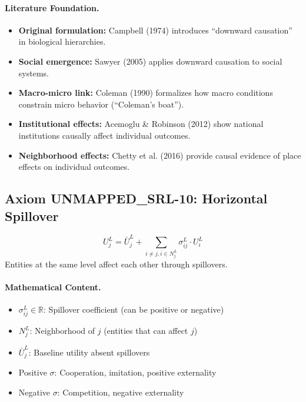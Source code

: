 \paragraph{Literature Foundation.}
\begin{itemize}
\item \textbf{Original formulation:} Campbell (1974) introduces ``downward causation'' 
in biological hierarchies.
\item \textbf{Social emergence:} Sawyer (2005) applies downward causation to 
social systems.
\item \textbf{Macro-micro link:} Coleman (1990) formalizes how macro conditions 
constrain micro behavior (``Coleman's boat'').
\item \textbf{Institutional effects:} Acemoglu \& Robinson (2012) show national 
institutions causally affect individual outcomes.
\item \textbf{Neighborhood effects:} Chetty et al. (2016) provide causal evidence 
of place effects on individual outcomes.
\end{itemize}

\subsection{Axiom UNMAPPED_SRL-10: Horizontal Spillover}

\begin{tcolorbox}[colback=gray!5!white, colframe=gray!75!black, title=Axiom UNMAPPED_SRL-10: Horizontal Spillover]
\begin{equation}
\boxed{
U^L_j = \bar{U}^L_j + \sum_{i \neq j, i \in N^L_j} \sigma^L_{ij} \cdot U^L_i
}
\end{equation}
Entities at the same level affect each other through spillovers.
\end{tcolorbox}

\paragraph{Mathematical Content.}
\begin{itemize}
\item $\sigma^L_{ij} \in \mathbb{R}$: Spillover coefficient (can be positive or negative)
\item $N^L_j$: Neighborhood of $j$ (entities that can affect $j$)
\item $\bar{U}^L_j$: Baseline utility absent spillovers
\item Positive $\sigma$: Cooperation, imitation, positive externality
\item Negative $\sigma$: Competition, negative externality
\end{itemize}

